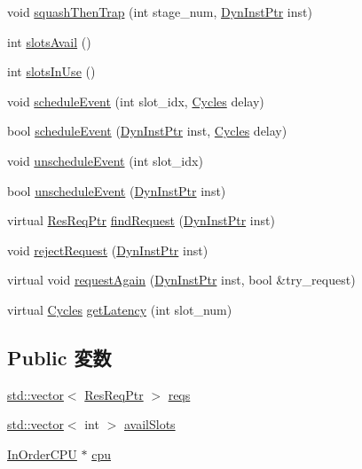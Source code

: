 \begin{DoxyCompactItemize}
\item 
void \hyperlink{classResource_ac04c1a8a5c1212f9bbdc1ce83b1da882}{squashThenTrap} (int stage\_\-num, \hyperlink{classRefCountingPtr}{DynInstPtr} inst)
\item 
int \hyperlink{classResource_aa376a7fab43ff33531fff37daaf97d30}{slotsAvail} ()
\item 
int \hyperlink{classResource_a7996fa2858e57c95ac52ee2813f816f7}{slotsInUse} ()
\item 
void \hyperlink{classResource_a55e9744a3539be9ff746b13b1d6bafc3}{scheduleEvent} (int slot\_\-idx, \hyperlink{classCycles}{Cycles} delay)
\item 
bool \hyperlink{classResource_a9463594c1003adcd1e810ad6cea904eb}{scheduleEvent} (\hyperlink{classRefCountingPtr}{DynInstPtr} inst, \hyperlink{classCycles}{Cycles} delay)
\item 
void \hyperlink{classResource_a30247366c4c8cb82c2a196a286d309ad}{unscheduleEvent} (int slot\_\-idx)
\item 
bool \hyperlink{classResource_a2ca5964896e91fdb616377369e29cfc4}{unscheduleEvent} (\hyperlink{classRefCountingPtr}{DynInstPtr} inst)
\item 
virtual \hyperlink{classResourceRequest}{ResReqPtr} \hyperlink{classResource_ae3afc1c63d17a49a6301bd18fca574a0}{findRequest} (\hyperlink{classRefCountingPtr}{DynInstPtr} inst)
\item 
void \hyperlink{classResource_a00d6f4600ca80ac12352a9c0d3922857}{rejectRequest} (\hyperlink{classRefCountingPtr}{DynInstPtr} inst)
\item 
virtual void \hyperlink{classResource_a9063fd6f97e36e3565247339ffa3882c}{requestAgain} (\hyperlink{classRefCountingPtr}{DynInstPtr} inst, bool \&try\_\-request)
\item 
virtual \hyperlink{classCycles}{Cycles} \hyperlink{classResource_a0d3550b57856a6b656d76b87a9d6b6e8}{getLatency} (int slot\_\-num)
\end{DoxyCompactItemize}
\subsection*{Public 変数}
\begin{DoxyCompactItemize}
\item 
\hyperlink{classstd_1_1vector}{std::vector}$<$ \hyperlink{classResourceRequest}{ResReqPtr} $>$ \hyperlink{classResource_a83b4e5928b54d2813c3c4911043e677d}{reqs}
\item 
\hyperlink{classstd_1_1vector}{std::vector}$<$ int $>$ \hyperlink{classResource_a1dd2ecf45bf9024f273d09813d993f97}{availSlots}
\item 
\hyperlink{classInOrderCPU}{InOrderCPU} $\ast$ \hyperlink{classResource_a41d682c28d0f49e04393c52815808782}{cpu}
\end{DoxyCompactItemize}
